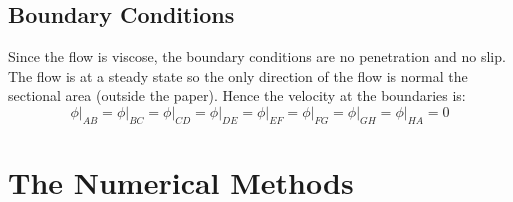 \documentclass[11pt, a4paper]{article}
\begin{document}
\subsection{Boundary Conditions}
Since the flow is viscose, the boundary conditions are no penetration and no slip. The flow is at a steady state so the only direction of the flow is normal the sectional area (outside the paper). Hence the velocity at the boundaries is:
\begin{equation}
    \left.\phi\right|_{AB}=\left.\phi\right|_{BC}=\left.\phi\right|_{CD}=\left.\phi\right|_{DE}=\left.\phi\right|_{EF}=\left.\phi\right|_{FG}=\left.\phi\right|_{GH}=\left.\phi\right|_{HA}=0
\end{equation}

\section{The Numerical Methods}
\end{document}
